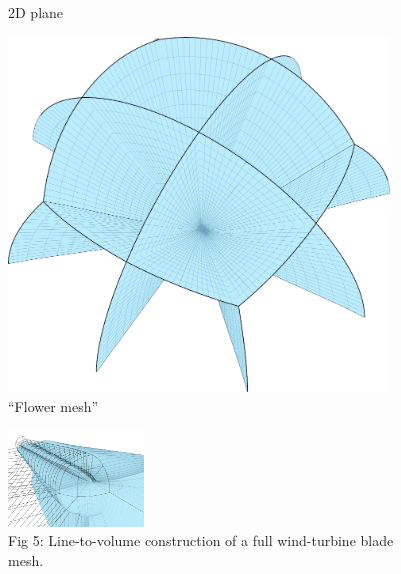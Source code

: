 \documentclass[landscape]{sintefposter}
\begin{document}
\begin{multicols}{3}
\begin{figure}[ht]
\begin{center}
\begin{minipage}[b]{0.28\linewidth}
\begin{center}
        \small{2D plane}
      \end{center}
    \end{minipage}
    \begin{minipage}[b]{0.28\linewidth}
      \begin{center}
        \includegraphics[width=0.9\textwidth]{Figures/wingtip-flower} \\
        \small{``Flower mesh''}
      \end{center}
    \end{minipage}
  \end{center}
\end{figure}
\begin{figure}[ht]
  \begin{center}
    \includegraphics[width=0.32\textwidth]{Figures/block-2} \\
    \small{
      Fig 5: Line-to-volume construction of a full wind-turbine blade mesh.
    }
  \end{center}
\end{figure}


\end{multicols}
\end{document}
